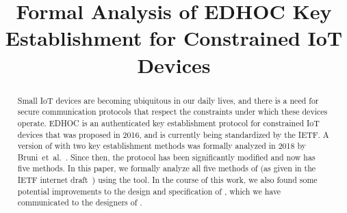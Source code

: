 \documentclass[runningheads, envcountsame, hidelinks, a4paper, draft, x11names]{llncs}
\begin{document}
\title{Formal Analysis of EDHOC Key Establishment for Constrained IoT Devices}
%
\author{}
%
%
\authorrunning{}
%
\institute{}
%
\maketitle
%

\begin{abstract}
Small IoT devices are becoming ubiquitous in our daily lives, and there is a need for secure communication protocols that respect the constraints under which these devices operate.
%
EDHOC is an authenticated key establishment protocol for constrained IoT devices that was proposed in 2016, and is currently being standardized by the IETF.
%
A version of \mEdhoc{} with two key establishment methods was formally analyzed in 2018 by
Bruni~et~al.~\cite{DBLP:conf/secsr/BruniJPS18}.
%
Since then, the protocol has been significantly modified and now has five methods.
%
In this paper, we formally analyze all five methods of \mEdhoc{} (as given in the IETF internet draft~\cite{selander-lake-edhoc-01}) using the \mTamarin{} tool.
%
%
In the course of this work, we also found some potential improvements to the design and specification of \mEdhoc, which we have communicated to the designers of \mEdhoc.
%
\end{abstract}
%

\end{document}
